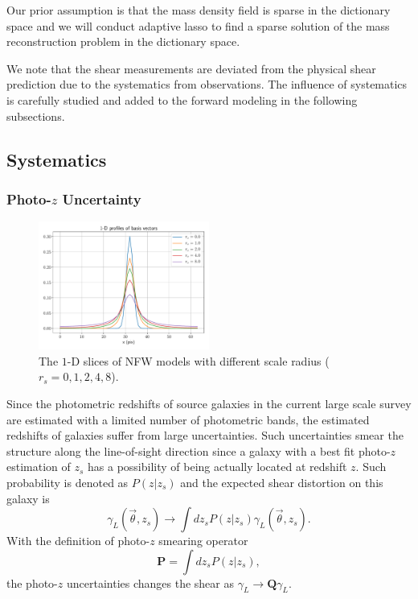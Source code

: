 \documentclass[twocolumn]{aastex62}
\begin{document}
Our prior assumption is that the mass density field is sparse in the dictionary space and we will conduct
adaptive lasso \citep{AdaLASSO-Zou2006} to find a sparse solution of the mass reconstruction problem in the
dictionary space.

We note that the shear measurements are deviated from the physical shear prediction due to the systematics
from observations. The influence of systematics is carefully studied and added to the forward modeling in the
following subsections.


\subsection{Systematics}
\label{subsec:method-Systematics}

\subsubsection{Photo-$z$ Uncertainty}
\label{subsec:method-photoz}
\begin{figure}
 \includegraphics[width=0.5\textwidth]{nfwlet-atom-1D.pdf}
 \caption{The $1$-D slices of NFW models with different scale radius ($r_s=0,1,2,4,8$).}
\end{figure}

Since the photometric redshifts of source galaxies in the current large scale survey are estimated with
a limited number of photometric bands, the estimated redshifts of galaxies suffer from large uncertainties.
Such uncertainties smear the structure along the line-of-sight direction since a galaxy with a best fit photo-$z$
estimation of $z_s$ has a possibility of being actually located at redshift $z$. Such probability is denoted as $P(z|z_s)$
and the expected shear distortion on this galaxy is
\begin{equation}\label{eq-delta2gamma-poz}
\gamma_L(\vec{\theta},z_s) \rightarrow \int dz_s P(z|z_s) \gamma_L(\vec{\theta},z_s).
\end{equation}
With the definition of photo-$z$ smearing operator
\begin{equation}
\mathbf{P} = \int dz_s P(z|z_s),
\end{equation}
the photo-$z$ uncertainties changes the shear as $\gamma_L \rightarrow \mathbf{Q} \gamma_L$.
\end{document}
